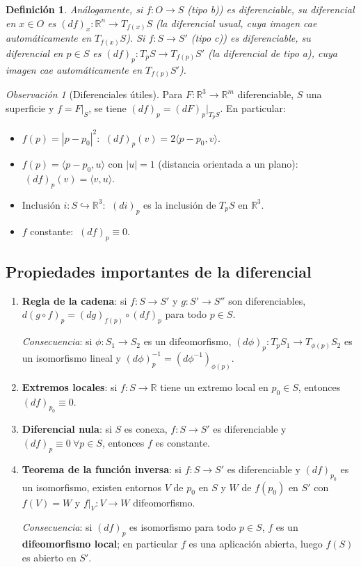 \documentclass[11pt]{article}
\theoremstyle{plain}
\newtheorem{definicion}[teorema]{Definición}
\theoremstyle{definition}
\theoremstyle{remark}
\newtheorem{observacion}[teorema]{Observación}
\begin{document}
\begin{definicion}
Análogamente, si $f:O\to S$ (tipo b)) es diferenciable, su diferencial en $x\in O$ es $(df)_x:\mathbb{R}^n\to T_{f(x)}S$ (la diferencial usual, cuya imagen cae automáticamente en $T_{f(x)}S$). Si $f:S\to S'$ (tipo c)) es diferenciable, su diferencial en $p\in S$ es $(df)_p:T_pS\to T_{f(p)}S'$ (la diferencial de tipo a), cuya imagen cae automáticamente en $T_{f(p)}S'$).
\end{definicion}

\begin{observacion}[Diferenciales útiles]
Para $F:\mathbb{R}^3\to\mathbb{R}^m$ diferenciable, $S$ una superficie y $f=F|_S$, se tiene $(df)_p=(dF)_p|_{T_pS}$. En particular:
\begin{itemize}
\item $f(p)=|p-p_0|^2$: $\ (df)_p(v)=2\langle p-p_0,v\rangle$.
\item $f(p)=\langle p-p_0,u\rangle$ con $|u|=1$ (distancia orientada a un plano): $\ (df)_p(v)=\langle v,u\rangle$.
\item Inclusión $i:S\hookrightarrow\mathbb{R}^3$: $\ (di)_p$ es la inclusión de $T_pS$ en $\mathbb{R}^3$.
\item $f$ constante: $\ (df)_p\equiv0$.
\end{itemize}
\end{observacion}

\subsection{Propiedades importantes de la diferencial}

\begin{enumerate}
\item \textbf{Regla de la cadena}: si $f:S\to S'$ y $g:S'\to S''$ son diferenciables, $d(g\circ f)_p=(dg)_{f(p)}\circ(df)_p$ para todo $p\in S$.

\noindent\emph{Consecuencia}: si $\phi:S_1\to S_2$ es un difeomorfismo, $(d\phi)_p:T_pS_1\to T_{\phi(p)}S_2$ es un isomorfismo lineal y $(d\phi)_p^{-1}=(d\phi^{-1})_{\phi(p)}$.

\item \textbf{Extremos locales}: si $f:S\to\mathbb{R}$ tiene un extremo local en $p_0\in S$, entonces $(df)_{p_0}\equiv0$.

\item \textbf{Diferencial nula}: si $S$ es conexa, $f:S\to S'$ es diferenciable y $(df)_p\equiv0\ \forall p\in S$, entonces $f$ es constante.

\item \textbf{Teorema de la función inversa}: si $f:S\to S'$ es diferenciable y $(df)_{p_0}$ es un isomorfismo, existen entornos $V$ de $p_0$ en $S$ y $W$ de $f(p_0)$ en $S'$ con $f(V)=W$ y $f|_V:V\to W$ difeomorfismo.

\noindent\emph{Consecuencia}: si $(df)_p$ es isomorfismo para todo $p\in S$, $f$ es un \textbf{difeomorfismo local}; en particular $f$ es una aplicación abierta, luego $f(S)$ es abierto en $S'$.
\end{enumerate}
\end{document}
